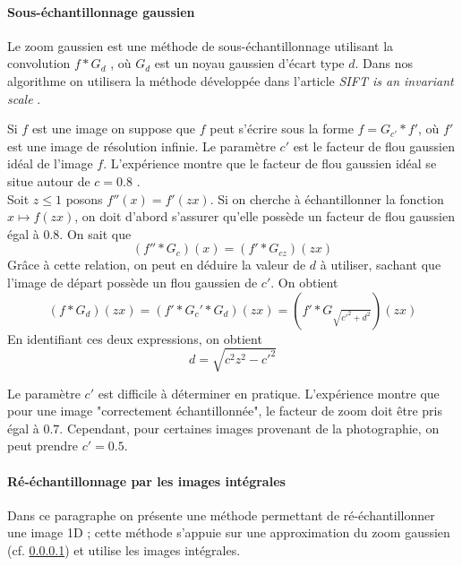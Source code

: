\paragraph{Sous-échantillonnage gaussien}
\label{zoom_gaussien}
Le zoom gaussien est une méthode de sous-échantillonnage utilisant la convolution $f*G_{d}$ , où $G_d$ est un noyau gaussien d'écart type $d$. Dans nos algorithme on utilisera la méthode développée dans l'article \emph{SIFT is an invariant scale} \cite{morel2011sift}.

Si $f$ est une image on suppose que $f$ peut s'écrire sous la forme $f=G_{c'} * f'$, où $f'$ est une image de résolution infinie. Le paramètre $c'$ est le facteur de flou gaussien idéal de l'image $f$. L'expérience montre que le facteur de flou gaussien idéal se situe autour de $c=0.8$ \cite{morel2011sift}.\\
Soit $z\le 1$ posons $f''(x)=f'(zx)$. Si on cherche à échantillonner la fonction  $x\mapsto f(zx)$,  on doit d'abord s'assurer qu'elle possède un facteur de flou gaussien égal à $0.8$. On sait que 
\begin{equation*}
(f''*G_{c})(x)=(f'*G_{cz})(zx)
\end{equation*}
Grâce à cette relation, on peut en déduire la valeur de $d$ à utiliser, sachant que l'image de départ possède un flou gaussien de $c'$. On obtient
\begin{equation*}
(f*G_d)(zx)=(f'*G_c'*G_d)(zx)=(f'*G_{\sqrt{c'^2 + d^2}})(zx)
\end{equation*}
En identifiant ces deux expressions, on obtient
\begin{equation}
d=\sqrt{c^2 z^2 - c'^2}
\label{formule_zoom_gaussien}
\end{equation}

Le paramètre $c'$ est difficile à déterminer en pratique. L'expérience montre que pour une image "correctement échantillonnée", le facteur de zoom doit être pris égal à $0.7$. Cependant, pour certaines images provenant de la photographie, on peut prendre $c'=0.5$.

\paragraph{Ré-échantillonnage par les images intégrales}
\label{4Integral}
Dans ce paragraphe on présente une méthode permettant de ré-échantillonner une image 1D ; cette méthode s'appuie sur une approximation du zoom gaussien (cf. \ref{zoom_gaussien}) et utilise les images intégrales.

